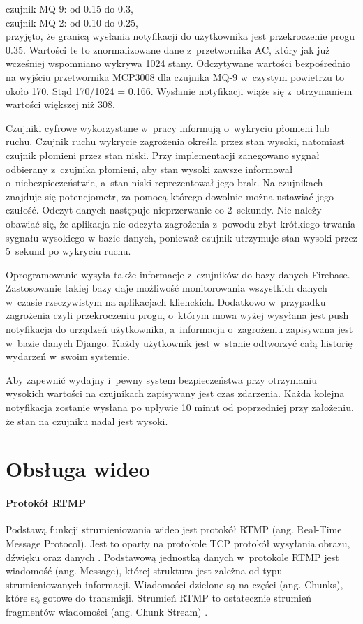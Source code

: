 \documentclass[polish,bachelor,a4paper,oneside]{ppfcmthesis}
\begin{document}
    czujnik MQ-9: od 0.15 do 0.3,\\
    czujnik MQ-2: od 0.10 do 0.25,\\
    przyjęto, że granicą wysłania notyfikacji do użytkownika jest przekroczenie progu 0.35. Wartości te to znormalizowane dane z~przetwornika AC, który jak już wcześniej wspomniano wykrywa 1024 stany. Odczytywane wartości bezpośrednio na wyjściu przetwornika MCP3008 dla czujnika MQ-9 w~czystym powietrzu to około 170. Stąd 170/1024 = 0.166. Wysłanie notyfikacji wiąże się z~otrzymaniem wartości większej niż 308.

    Czujniki cyfrowe wykorzystane w~pracy informują o~wykryciu płomieni lub ruchu. Czujnik ruchu wykrycie zagrożenia określa przez stan wysoki, natomiast czujnik płomieni przez stan niski. Przy implementacji zanegowano sygnał odbierany z~czujnika płomieni, aby stan wysoki zawsze informował o~niebezpieczeństwie, a~stan niski reprezentował jego brak. Na czujnikach znajduje się potencjometr, za pomocą którego dowolnie można ustawiać jego czułość. Odczyt danych następuje nieprzerwanie co 2~sekundy. Nie należy obawiać się, że aplikacja nie odczyta zagrożenia z~powodu zbyt krótkiego trwania sygnału wysokiego w bazie danych, ponieważ czujnik utrzymuje stan wysoki przez 5~sekund po wykryciu ruchu.

    Oprogramowanie wysyła także informacje z~czujników do bazy danych Firebase. Zastosowanie takiej bazy daje możliwość monitorowania wszystkich danych w~czasie rzeczywistym na aplikacjach klienckich. Dodatkowo w~przypadku zagrożenia czyli przekroczeniu progu, o~którym mowa wyżej wysyłana jest push notyfikacja do urządzeń użytkownika, a~informacja o~zagrożeniu zapisywana jest w~bazie danych Django. Każdy użytkownik jest w~stanie odtworzyć całą historię wydarzeń w~swoim systemie.

    Aby zapewnić wydajny i~pewny system bezpieczeństwa przy otrzymaniu wysokich wartości na czujnikach zapisywany jest czas zdarzenia. Każda kolejna notyfikacja zostanie wysłana po upływie 10 minut od poprzedniej przy założeniu, że stan na czujniku nadal jest wysoki.

    \section{Obsługa wideo}

    \paragraph{Protokół RTMP}
    Podstawą funkcji strumieniowania wideo jest protokół RTMP (ang. Real-Time Message Protocol). Jest to oparty na protokole TCP protokół wysyłania obrazu, dźwięku oraz danych \cite{MOBILERTMP}.
    Podstawową jednostką danych w~protokole RTMP jest wiadomość (ang. Message), której struktura jest zależna od typu strumieniowanych informacji.
    Wiadomości dzielone są na części (ang. Chunks), które są gotowe do transmisji. Strumień RTMP to ostatecznie strumień fragmentów wiadomości (ang. Chunk Stream) \cite{STREAMRTMP}.
\end{document}
